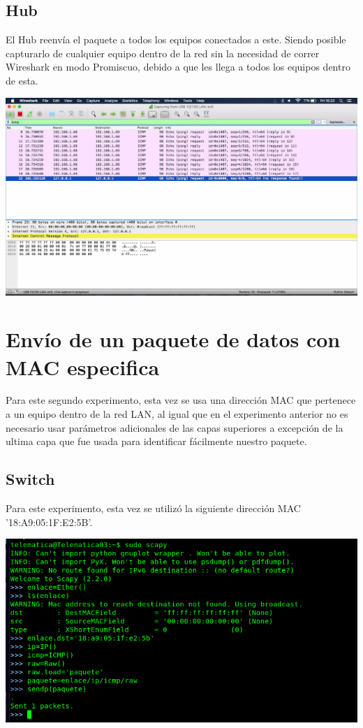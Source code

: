 \documentclass[spanish]{udpreport}
\begin{document}
\subsection{Hub}

El Hub reenvía el paquete a todos los equipos conectados a este. Siendo posible capturarlo de cualquier equipo dentro de la red sin la necesidad de correr Wireshark en modo Promiscuo, debido a que les llega a todos los equipos dentro de esta.

\begin{center}
	\includegraphics[scale=.3]{imagenes/Hub/FF.jpg}
\end{center}


\section{Envío de un paquete de datos con MAC especifica}

Para este segundo experimento, esta vez se usa una dirección MAC que pertenece a un equipo dentro de la red LAN, al igual que en el experimento anterior no es necesario usar parámetros adicionales de las capas superiores a excepción de la ultima capa que fue usada para identificar fácilmente nuestro paquete.

\subsection{Switch}

Para este experimento, esta vez se utilizó la siguiente dirección MAC '18:A9:05:1F:E2:5B'.
\begin{center}
	\includegraphics[scale=.37]{imagenes/Switch/Test_2.png}
\end{center}
\end{document}
